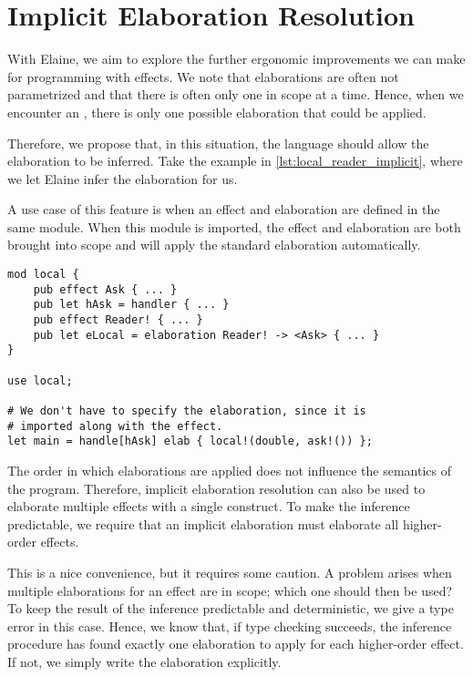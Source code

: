 \chapter{Implicit Elaboration Resolution}\label{chap:elabres}


With Elaine, we aim to explore the further ergonomic improvements we can make for programming with effects. We note that elaborations are often not parametrized and that there is often only one in scope at a time. Hence, when we encounter an \elab, there is only one possible elaboration that could be applied.

Therefore, we propose that, in this situation, the language should allow the elaboration to be inferred. Take the example in \cref{lst:local_reader_implicit}, where we let Elaine infer the elaboration for us.


A use case of this feature is when an effect and elaboration are defined in the same module. When this module is imported, the effect and elaboration are both brought into scope and  will apply the standard elaboration automatically.

\begin{lstlisting}[language=elaine,style=fancy]
mod local {
    pub effect Ask { ... }
    pub let hAsk = handler { ... }
    pub effect Reader! { ... }
    pub let eLocal = elaboration Reader! -> <Ask> { ... }
}

use local;

# We don't have to specify the elaboration, since it is
# imported along with the effect.
let main = handle[hAsk] elab { local!(double, ask!()) };
\end{lstlisting}

The order in which elaborations are applied does not influence the semantics of the program. Therefore, implicit elaboration resolution can also be used to elaborate multiple effects with a single  construct. To make the inference predictable, we require that an implicit elaboration must elaborate all higher-order effects.

This is a nice convenience, but it requires some caution. A problem arises when multiple elaborations for an effect are in scope; which one should then be used? To keep the result of the inference predictable and deterministic, we give a type error in this case. Hence, we know that, if type checking succeeds, the inference procedure has found exactly one elaboration to apply for each higher-order effect. If not, we simply write the elaboration explicitly.


